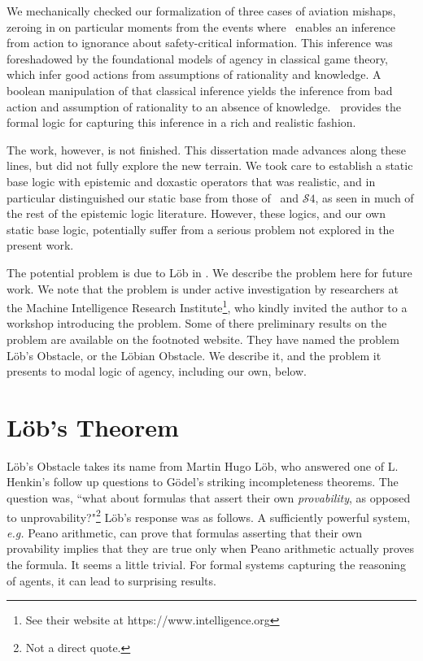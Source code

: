 We mechanically checked our formalization of three cases of aviation mishaps, zeroing in on particular moments from the events where \DASL\ enables an inference from action to ignorance about safety-critical information. This inference was foreshadowed by the foundational models of agency in classical game theory, which infer good actions from assumptions of rationality and knowledge. A boolean manipulation of that classical inference yields the inference from bad action and assumption of rationality to an absence of knowledge. \DASL\ provides the formal logic for capturing this inference in a rich and realistic fashion.

The work, however, is not finished. This dissertation made advances along these lines, but did not fully explore the new terrain. We took care to establish a static base logic with epistemic and doxastic operators that was realistic, and in particular distinguished our static base from those of \SFive\ and $\mathcal{S}4$, as seen in much of the rest of the epistemic logic literature. However, these logics, and our own static base logic, potentially suffer from a serious problem not explored in the present work.

The potential problem is due to L\"ob in \cite{Lob}. We describe the problem here for future work. We note that the problem is under active investigation by researchers at the Machine Intelligence Research Institute\footnote{See their website at https://www.intelligence.org}, who kindly invited the author to a workshop introducing the problem. Some of there preliminary results on the problem are available on the footnoted website. They have named the problem L\"ob's Obstacle, or the L\"obian Obstacle. We describe it, and the problem it presents to modal logic of agency, including our own, below.

\section{L\"ob's Theorem}
\label{sec:lob_section}
L\"ob's Obstacle takes its name from Martin Hugo L\"ob, who answered one of L. Henkin's follow up questions to G\"odel's striking incompleteness theorems. The question was, ``what about formulas that assert their own \emph{provability}, as opposed to unprovability?"\footnote{Not a direct quote.} L\"ob's response was as follows. A sufficiently powerful system, \emph{e.g.} Peano arithmetic, can prove that formulas asserting that their own provability implies that they are true only when Peano arithmetic actually proves the formula. It seems a little trivial. For formal systems capturing the reasoning of agents, it can lead to surprising results.

